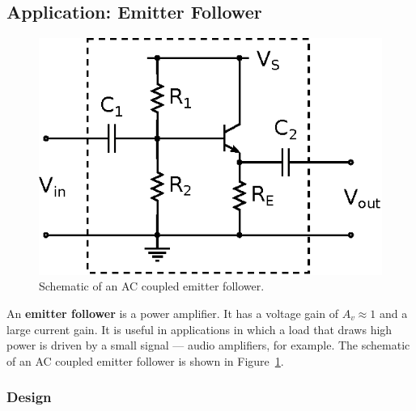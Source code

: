 \documentclass[11pt]{article}
\begin{document}
\subsection{Application: Emitter Follower}
\label{sec:emitterfollower}

\begin{figure}[ht]
  \begin{center}
    \includegraphics{emitterfollower.eps}
    \caption{Schematic of an AC coupled emitter follower.}
    \label{fig:emitterfollower}
  \end{center}
\end{figure}

An \textbf{emitter follower} is a power amplifier. It has a
voltage gain of $A_v \approx 1$ and a large current gain. It is useful
in applications in which a load that draws high power is driven by a
small signal --- audio amplifiers, for example.
The schematic of an AC coupled emitter follower is shown in
Figure~\ref{fig:emitterfollower}. 

\subsubsection*{Design}
\end{document}
